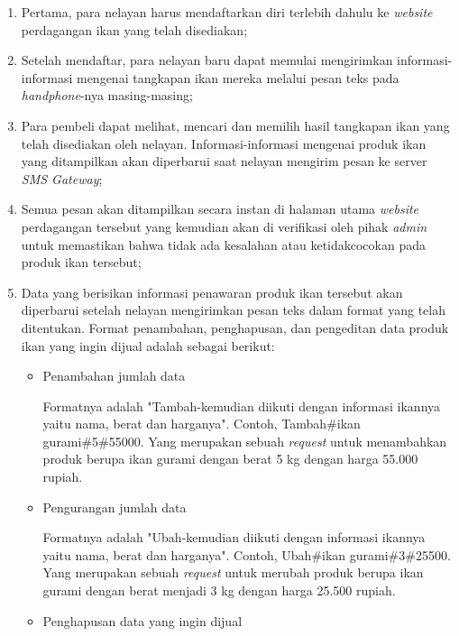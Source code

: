 \documentclass[a4paper]{article}
\begin{document}
\begin{itemize}
\begin{enumerate}
        \begin{enumerate}
            \item Pertama, para nelayan harus mendaftarkan diri terlebih dahulu ke \textit{website} perdagangan ikan yang telah disediakan\autocite{c2c-fish-marketplace};
            \item Setelah mendaftar, para nelayan baru dapat memulai mengirimkan informasi-informasi mengenai tangkapan ikan mereka melalui pesan teks pada \textit{handphone}-nya masing-masing\autocite{c2c-fish-marketplace};
            \item Para pembeli dapat melihat, mencari dan memilih hasil tangkapan ikan yang telah disediakan oleh nelayan. Informasi-informasi mengenai produk ikan yang ditampilkan akan diperbarui saat nelayan mengirim pesan ke server \textit{SMS Gateway}\autocite{c2c-fish-marketplace};
            \item Semua pesan akan ditampilkan secara instan di halaman utama \textit{website} perdagangan tersebut yang kemudian akan di verifikasi oleh pihak \textit{admin} untuk memastikan bahwa tidak ada kesalahan atau ketidakcocokan pada produk ikan tersebut\autocite{c2c-fish-marketplace};
            \item Data yang berisikan informasi penawaran produk ikan tersebut akan diperbarui setelah nelayan mengirimkan pesan teks dalam format yang telah ditentukan\autocite{c2c-fish-marketplace}. Format penambahan, penghapusan, dan pengeditan data produk ikan yang ingin dijual adalah sebagai berikut:
    
            \begin{itemize}
                \item Penambahan jumlah data
    
                Formatnya adalah "Tambah-kemudian diikuti dengan informasi ikannya yaitu nama, berat dan harganya". Contoh, Tambah\#ikan gurami\#5\#55000. Yang merupakan sebuah \textit{request} untuk menambahkan produk berupa ikan gurami dengan berat 5 kg dengan harga 55.000 rupiah.
    
                \item Pengurangan jumlah data
    
                Formatnya adalah "Ubah-kemudian diikuti dengan informasi ikannya yaitu nama, berat dan harganya". Contoh, Ubah\#ikan gurami\#3\#25500. Yang merupakan sebuah \textit{request} untuk merubah produk berupa ikan gurami dengan berat menjadi 3 kg dengan harga 25.500 rupiah.
    
                \item Penghapusan data yang ingin dijual
    

\end{itemize}
\end{enumerate}
\end{enumerate}
\end{itemize}
\end{document}
